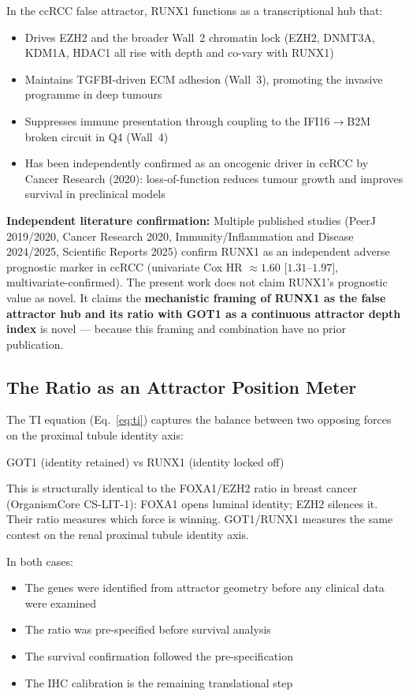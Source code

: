 \documentclass[11pt, a4paper]{article}
\begin{document}
In the ccRCC false attractor, RUNX1 functions
as a transcriptional hub that:

\begin{itemize}
    \item Drives EZH2 and the broader
    Wall~2 chromatin lock (EZH2, DNMT3A,
    KDM1A, HDAC1 all rise with depth and
    co-vary with RUNX1)
    \item Maintains TGFBI-driven ECM
    adhesion (Wall~3), promoting the
    invasive programme in deep tumours
    \item Suppresses immune presentation
    through coupling to the IFI16$\to$B2M
    broken circuit in Q4 (Wall~4)
    \item Has been independently confirmed
    as an oncogenic driver in ccRCC by
    Cancer Research (2020): loss-of-function
    reduces tumour growth and improves
    survival in preclinical models
\end{itemize}

\textbf{Independent literature confirmation:}
Multiple published studies (PeerJ 2019/2020,
Cancer Research 2020, Immunity/Inflammation
and Disease 2024/2025, Scientific Reports 2025)
confirm RUNX1 as an independent adverse
prognostic marker in ccRCC (univariate Cox
HR $\approx 1.60$ $[1.31$--$1.97]$,
multivariate-confirmed). The present work
does not claim RUNX1's prognostic value
as novel. It claims the \textbf{mechanistic
framing of RUNX1 as the false attractor hub
and its ratio with GOT1 as a continuous
attractor depth index} is novel --- because
this framing and combination have no
prior publication.

\subsection{The Ratio as an Attractor
Position Meter}

The TI equation (Eq.~\ref{eq:ti}) captures
the balance between two opposing forces on
the proximal tubule identity axis:

\begin{center}
GOT1 (identity retained) vs
RUNX1 (identity locked off)
\end{center}

This is structurally identical to the
FOXA1/EZH2 ratio in breast cancer
(OrganismCore CS-LIT-1): FOXA1 opens
luminal identity; EZH2 silences it.
Their ratio measures which force is winning.
GOT1/RUNX1 measures the same contest on
the renal proximal tubule identity axis.

In both cases:
\begin{itemize}[noitemsep]
    \item The genes were identified from
    attractor geometry before any clinical
    data were examined
    \item The ratio was pre-specified
    before survival analysis
    \item The survival confirmation
    followed the pre-specification
    \item The IHC calibration is the
    remaining translational step
\end{itemize}
\end{document}

